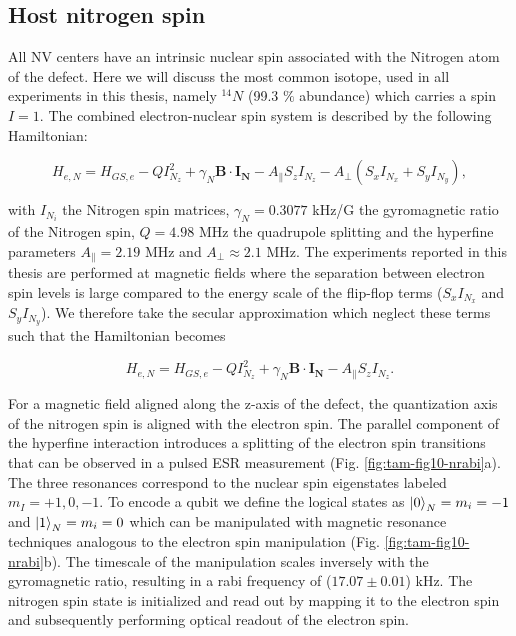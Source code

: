 \subsection{Host nitrogen spin}
All NV centers have an intrinsic nuclear spin associated with the Nitrogen atom of the defect. Here we will discuss the most common isotope, used in all experiments in this thesis, namely $^{14}N$ (99.3 $\%$ abundance) which carries a spin $I = 1$. The combined electron-nuclear spin system is described by the following Hamiltonian:

\begin{equation}
H_{e,N} = H_{GS,e} - Q I_{N_z}^2 + \gamma_N \mathbf{B} \cdot \mathbf{I_N} - A_{\parallel} S_z I_{N_z} - A_{\perp}(S_x I_{N_x}+S_y I_{N_y}),
\end{equation}

with $I_{N_i}$ the Nitrogen spin matrices, $\gamma_N = 0.3077$ kHz/G the gyromagnetic ratio of the Nitrogen spin, $Q = 4.98$ MHz the quadrupole splitting and the hyperfine parameters $A_{\parallel} = 2.19$ MHz and $A_{\perp} \approx 2.1$ MHz. The experiments reported in this thesis are performed at magnetic fields where the separation between electron spin levels is large compared to the energy scale of the flip-flop terms ($S_x I_{N_x}$ and $S_y I_{N_y}$). We therefore take the secular approximation which neglect these terms such that the Hamiltonian becomes

\begin{equation}
H_{e,N} = H_{GS,e} - Q I_{N_z}^2 + \gamma_N \mathbf{B} \cdot \mathbf{I_N} - A_{\parallel} S_z I_{N_z}.
\end{equation}

For a magnetic field aligned along the z-axis of the defect, the quantization axis of the nitrogen spin is aligned with the electron spin. The parallel component of the hyperfine interaction introduces a splitting of the electron spin transitions that can be observed in a pulsed ESR measurement (Fig. \ref{fig:tam-fig10-nrabi}a). The three resonances correspond to the nuclear spin eigenstates labeled $m_I = +1, 0, -1$. To encode a qubit we define the logical states as $\left|0\right>_N = m_i = -1$ and $\left|1\right>_N = m_i = 0$ which can be manipulated with magnetic resonance techniques analogous to the electron spin manipulation (Fig. \ref{fig:tam-fig10-nrabi}b). The timescale of the manipulation scales inversely with the gyromagnetic ratio, resulting in a rabi frequency of ($17.07 \pm 0.01$) kHz. The nitrogen spin state is initialized and read out by mapping it to the electron spin and subsequently performing optical readout of the electron spin.

